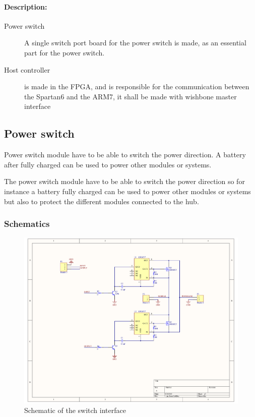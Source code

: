 \paragraph{Description:}
\begin{description}
	\item[Power switch] A single switch port board for the power switch is made, as an essential part for the power switch.
	\item[Host controller] is made in the FPGA, and is responsible for the communication between the Spartan6 and the ARM7, it shall be made with wishbone master interface 
\end{description}

\subsection{Power switch}
Power switch module have to be able to switch the power direction. A battery after fully charged can be used to power other modules or systems.

The power switch module have to be able to switch the power direction so for instance a battery fully charged can be used to power other modules or systems but also to protect the different modules connected to the hub.

\subsubsection{Schematics}

\begin{figure}[H]
	\begin{centering}
		 \includegraphics[width=1.0\textwidth,page=1]{images/ps_schematics.pdf}
		\caption{Schematic of the switch interface}
	\end{centering}
\end{figure}

